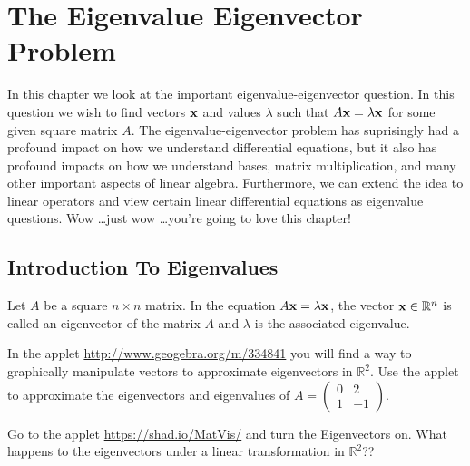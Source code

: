 \chapter{The Eigenvalue Eigenvector Problem}
In this chapter we look at the important eigenvalue-eigenvector question.  In this
question we wish to find vectors ${\bf x}$ and values $\lambda$ such that $A {\bf x} = \lambda
{\bf x}$ for some given square matrix $A$.  The eigenvalue-eigenvector problem has suprisingly
had a profound impact on how we understand
differential equations, but it also has profound impacts on how we understand bases, matrix
multiplication, and many other important aspects of linear algebra.  Furthermore, we can
extend the idea to linear operators and view certain linear differential equations as eigenvalue
questions.  Wow \ldots just wow \ldots you're going to love this chapter!

\section{Introduction To Eigenvalues}
\begin{definition}
    Let $A$ be a square $n\times n$ matrix.  In the equation $A {\bf x} = \lambda {\bf x}$, the
    vector ${\bf x} \in \mathbb{R}^n$ is called an eigenvector of the matrix $A$ and $\lambda$
    is the associated eigenvalue.
\end{definition}

\begin{problem}
    In the applet 
        \href{http://www.geogebra.org/m/334841}{http://www.geogebra.org/m/334841}
    you will find a way to graphically manipulate vectors to approximate eigenvectors in
    $\mathbb{R}^2$.  Use the applet to approximate the eigenvectors and eigenvalues of $A
    = \begin{pmatrix} 0 & 2 \\ 1 & -1 \end{pmatrix}$.
\end{problem}

\begin{problem}
    Go to the applet \href{https://shad.io/MatVis/}{https://shad.io/MatVis/} and turn the
    Eigenvectors on.  What happens to the eigenvectors under a linear transformation in
    $\mathbb{R}^2$??
\end{problem}


